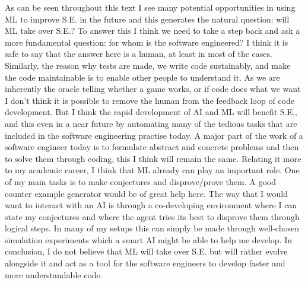 \documentclass[11pt]{article}
\begin{document}
As can be seen throughout this text I see many potential opportunities in using ML to improve S.E. in the future and this generates the natural question: will ML take over S.E.? To answer this I think we need to take a step back and ask a more fundamental question: for whom is the software engineered? I think it is safe to say that the answer here is a human, at least in most of the cases. Similarly, the reason why tests are made, we write code sustainably, and make the code maintainable is to enable other people to understand it. As we are inherently the oracle telling whether a game works, or if code does what we want I don't think it is possible to remove the human from the feedback loop of code development. But I think the rapid development of AI and ML will benefit S.E., and this even in a near future by automating many of the tedious tasks that are included in the software engineering practise today. A major part of the work of a software engineer today is to formulate abstract and concrete problems and then to solve them through coding, this I think will remain the same. Relating it more to my academic career, I think that ML already can play an important role. One of my main tasks is to make conjectures and disprove/prove them. A good counter example generator would be of great help here. The way that I would want to interact with an AI is through a co-developing environment where I can state my conjectures and where the agent tries its best to disprove them through logical steps. In many of my setups this can simply be made through well-chosen simulation experiments which a smart AI might be able to help me develop. In conclusion, I do not believe that ML will take over S.E. but will rather evolve alongside it and act as a tool for the software engineers to develop faster and more understandable code.
\end{document}
